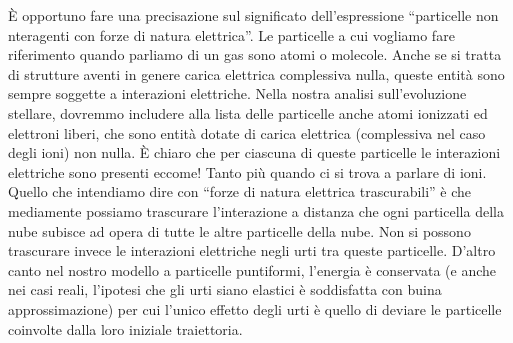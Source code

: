 \`E  opportuno fare una precisazione sul significato dell'espressione
``particelle non nteragenti con forze di natura elettrica''.  Le particelle a
cui vogliamo fare riferimento quando parliamo di un gas sono atomi o molecole.
Anche se si tratta di strutture aventi in genere carica elettrica complessiva
nulla, queste entit\`a sono sempre soggette a interazioni elettriche.  Nella
nostra analisi sull'evoluzione stellare, dovremmo includere alla lista delle
particelle anche atomi ionizzati ed elettroni liberi, che sono entit\`a dotate
di carica elettrica (complessiva nel caso degli ioni) non nulla.  \`E chiaro che
per ciascuna di queste particelle le interazioni elettriche sono presenti
eccome! Tanto pi\`u quando ci si trova a parlare di ioni.  Quello che intendiamo
dire con ``forze di natura elettrica trascurabili'' \`e che mediamente possiamo
trascurare l'interazione a distanza che ogni particella della nube subisce ad
opera di tutte le altre particelle della nube.  Non si possono trascurare invece
le interazioni elettriche negli urti tra queste particelle.  D'altro canto nel
nostro modello a particelle puntiformi, l'energia \`e conservata (e anche nei
casi reali, l'ipotesi che gli urti siano elastici \`e soddisfatta con buina
approssimazione) per cui l'unico effetto degli urti \`e quello di deviare le
particelle coinvolte dalla loro iniziale traiettoria.

